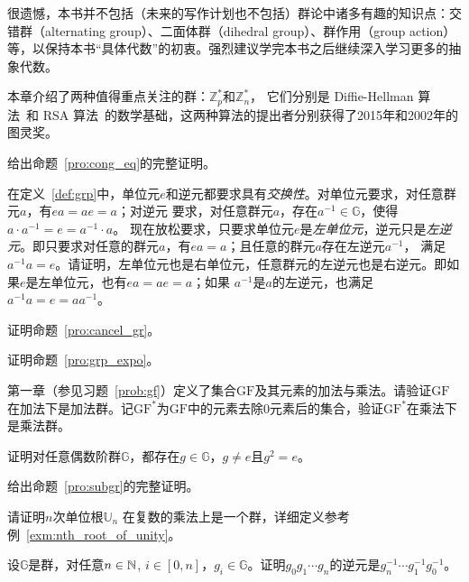 很遗憾，本书并不包括（未来的写作计划也不包括）群论中诸多有趣的知识点：交错群（alternating group）、二面体群（dihedral group）、群作用（group action）等，以保持本书“具体代数”的初衷。强烈建议学完本书之后继续深入学习更多的抽象代数。

本章介绍了两种值得重点关注的群：$\mathbb{Z}_p^*$和$\mathbb{Z}_n^*$，
它们分别是 Diffie-Hellman 算法~\cite{DH76}和 RSA 算法~\cite{RSA78}的数学基础，这两种算法的提出者分别获得了2015年和2002年的图灵奖。
\begin{problemset}

\item 给出命题~\ref{pro:cong_eq}的完整证明。

\item 在定义~\ref{def:grp}中，单位元$e$和逆元都要求具有\emph{交换性}。对单位元要求，对任意群元$a$，有$ea = ae = a$；对逆元
要求，对任意群元$a$，存在$a^{-1}\in \mathbb{G}$，使得$a\cdot a^{-1} = e = a^{-1} \cdot a$。
现在放松要求，只要求单位元$e$是\emph{左单位元}，逆元只是\emph{左逆元}。即只要求对任意的群元$a$，有$ea = a$；且任意的群元$a$存在左逆元$a^{-1}$，
满足$a^{-1} a = e$。请证明，左单位元也是右单位元，任意群元的左逆元也是右逆元。即如果$e$是左单位元，也有$ea = ae = a$；如果
$a^{-1}$是$a$的左逆元，也满足$a^{-1} a = e = a a^{-1}$。%

\item 证明命题~\ref{pro:cancel_gr}。

\item 证明命题~\ref{pro:grp_expo}。

\item 第一章（参见习题~\ref{prob:gf}）定义了集合$\mathrm{GF}$及其元素的加法与乘法。请验证$\mathrm{GF}$在加法下是加法群。记$\mathrm{GF}^*$为$\mathrm{GF}$中的元素去除$0$元素后的集合，验证$\mathrm{GF}^*$在乘法下是乘法群。

\item 证明对任意偶数阶群$\mathbb{G}$，都存在$g \in \mathbb{G}$，$g \neq e$且$g^2 = e$。

\item  给出命题~\ref{pro:subgr}的完整证明。 

\item  请证明$n$次单位根$\mathbb{U}_n $ 在复数的乘法上是一个群，详细定义参考例~\ref{exm:nth_root_of_unity}。

\item 设$\mathbb{G}$是群，对任意$n\in {\mathbb N}$, $i \in [0, n]$，$g_i \in \mathbb{G}$。证明$g_0 g_1 \cdots g_n$的逆元是$g_n^{-1} \cdots g_1^{-1} g_0^{-1}$。


\end{problemset}
